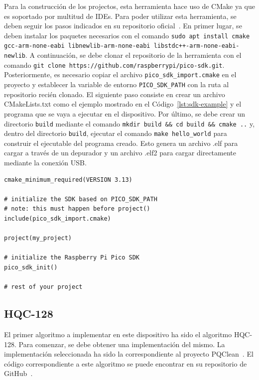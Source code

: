 Para la construcción de los projectos, esta herramienta hace uso de CMake ya que es soportado por multitud de IDEs.
Para poder utilizar esta herramienta, se deben seguir los pasos indicados en su repositorio oficial~\cite{pico-sdk-github}.
En primer lugar, se deben instalar los paquetes necesarios con el comando \texttt{sudo apt install cmake gcc-arm-none-eabi libnewlib-arm-none-eabi libstdc++-arm-none-eabi-newlib}.
A continuación, se debe clonar el repositorio de la herramienta con el comando \texttt{git clone https://github.com/raspberrypi/pico-sdk.git}.
Posteriormente, es necesario copiar el archivo \texttt{pico\_sdk\_import.cmake} en el proyecto y establecer la variable de entorno \texttt{PICO\_SDK\_PATH} con la ruta al repositorio recién clonado.
El siguiente paso consiste en crear un archivo CMakeLists.txt como el ejemplo mostrado en el Código~\ref{lst:sdk-example} y el programa que se vaya a ejecutar en el dispositivo.
Por último, se debe crear un directorio \texttt{build} mediante el comando \texttt{mkdir build \&\& cd build \&\& cmake ..} y, dentro del directorio \texttt{build}, ejecutar el comando \texttt{make hello\_world} para construir el ejecutable del programa creado.
Esto genera un archivo .elf para cargar a través de un depurador y un archivo .elf2 para cargar directamente mediante la conexión \ac{USB}.

\begin{lstlisting}[label={lst:sdk-example},style=Cnice,firstnumber=1,caption={Ejemplo de CMakeLists.txt~\cite{pico-sdk-github}.}]
cmake_minimum_required(VERSION 3.13)

# initialize the SDK based on PICO_SDK_PATH
# note: this must happen before project()
include(pico_sdk_import.cmake)

project(my_project)

# initialize the Raspberry Pi Pico SDK
pico_sdk_init()

# rest of your project
\end{lstlisting}


\subsection{HQC-128}\label{subsec:hqc}

El primer algoritmo a implementar en este dispositivo ha sido el algoritmo HQC-128.
Para comenzar, se debe obtener una implementación del mismo.
La implementación seleccionada ha sido la correspondiente al proyecto PQClean~\cite{SSR:KSSW22}.
El código correspondiente a este algoritmo se puede encontrar en su repositorio de GitHub~\cite{pqclean-github}.


